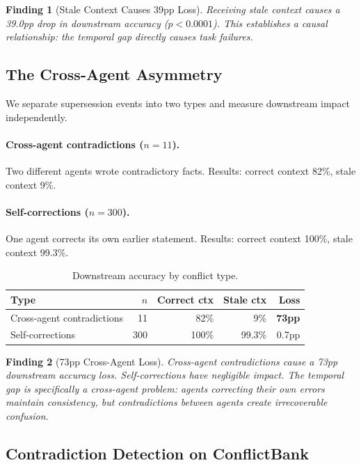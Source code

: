 \documentclass{article}
\newtheorem{finding}{Finding}
\begin{document}
\begin{finding}[Stale Context Causes 39pp Loss]
Receiving stale context causes a 39.0pp drop in downstream accuracy ($p < 0.0001$). This establishes a causal relationship: the temporal gap directly causes task failures.
\end{finding}

\subsection{The Cross-Agent Asymmetry}
\label{sec:asymmetry}

We separate supersession events into two types and measure downstream impact independently.

\paragraph{Cross-agent contradictions ($n{=}11$).} Two different agents wrote contradictory facts. Results: correct context 82\%, stale context 9\%.

\paragraph{Self-corrections ($n{=}300$).} One agent corrects its own earlier statement. Results: correct context 100\%, stale context 99.3\%.

\begin{table}[h]
\centering
\caption{Downstream accuracy by conflict type.}
\begin{tabular}{lrrrr}
\toprule
Type & $n$ & Correct ctx & Stale ctx & Loss \\
\midrule
Cross-agent contradictions & 11 & 82\% & 9\% & \textbf{73pp} \\
Self-corrections & 300 & 100\% & 99.3\% & 0.7pp \\
\bottomrule
\end{tabular}
\label{tab:asymmetry}
\end{table}

\begin{finding}[73pp Cross-Agent Loss]
Cross-agent contradictions cause a 73pp downstream accuracy loss. Self-corrections have negligible impact. The temporal gap is specifically a \emph{cross-agent} problem: agents correcting their own errors maintain consistency, but contradictions between agents create irrecoverable confusion.
\end{finding}

\subsection{Contradiction Detection on ConflictBank}
\end{document}
